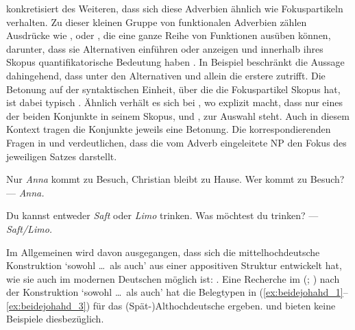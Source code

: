 \citet[425--428]{johannessen2005} konkretisiert des Weiteren, dass sich diese
Adverbien ähnlich wie Fokuspartikeln verhalten. Zu dieser kleinen Gruppe von
funktionalen Adverbien zählen Ausdrücke wie ,  oder
, die eine ganze Reihe von Funktionen ausüben können, darunter, dass
sie Alternativen einführen oder anzeigen und innerhalb ihres Skopus
quantifikatorische Bedeutung haben \autocite[vgl.][1--4, 15]{koenig1991}. In
Beispiel  beschränkt  die Aussage dahingehend, dass
unter den Alternativen  und  allein die erstere
zutrifft. Die Betonung auf der syntaktischen Einheit, über die die
Fokuspartikel Skopus hat, ist dabei typisch \autocite[10--14]{koenig1991}.
Ähnlich verhält es sich bei , wo  explizit
macht, dass nur eines der beiden Konjunkte in seinem Skopus,  und
, zur Auswahl steht. Auch in diesem Kontext tragen die Konjunkte
jeweils eine Betonung. Die korrespondierenden Fragen in
 und  verdeutlichen, dass die vom Adverb
eingeleitete NP den Fokus des jeweiligen Satzes darstellt.

\begin{exe}
\ex\label{ex:focpart_1}
\begin{xlist}
	\ex \label{ex:focpart1_1}
		Nur \emph{Anna} kommt zu Besuch, Christian bleibt zu
		Hause.
	\ex \label{ex:focpart1_2}
		Wer kommt zu Besuch? --- \emph{Anna.}
\end{xlist}

\ex \begin{xlist}
	\ex \label{ex:focpart2_1}
		Du kannst entweder \emph{Saft} oder \emph{Limo} trinken.
	\ex \label{ex:focpart2_2}
		Was möchtest du trinken? --- \emph{Saft/Limo.}
\end{xlist}
\end{exe}

Im Allgemeinen wird davon ausgegangen, dass sich die
mittelhochdeutsche Konstruktion 
`sowohl \dots\ als auch' aus einer appositiven Struktur entwickelt hat, wie sie
auch im modernen Deutschen möglich ist: 
\autocite[vgl.][626--627 und die dortigen Referenzen]{ksw2}. Eine Recherche im
 (; \nosh\cite{ddd}) nach der Konstruktion  `sowohl \dots\ als auch' \autocite[vgl.][49]{schuetzeichel2012} hat
die Belegtypen in (\ref{ex:beidejohahd_1}--\ref{ex:beidejohahd_3}) für das
(Spät-)Althochdeutsche ergeben. \citet{braune2018} und
\citet{schrodt2004} bieten keine Beispiele dies\-bezüglich.

